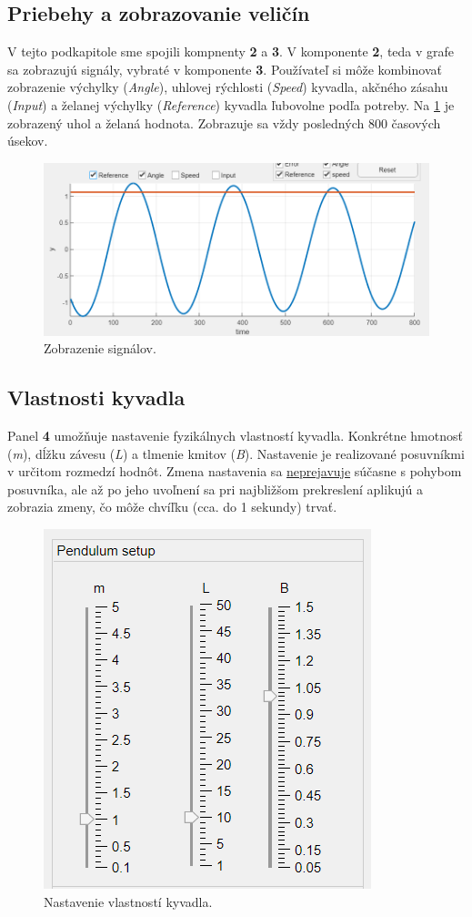  \subsection{Priebehy a zobrazovanie veličín}
 V tejto podkapitole sme spojili kompnenty \textbf{2} a \textbf{3}. V komponente \textbf{2}, teda v grafe sa zobrazujú signály, vybraté v komponente \textbf{3}. 
 Používateľ si môže kombinovať zobrazenie výchylky (\textit{Angle}), uhlovej rýchlosti (\textit{Speed}) kyvadla, akčného zásahu (\textit{Input}) a želanej výchylky (\textit{Reference}) kyvadla ľubovolne podľa potreby. Na \cref{fig:prieb} je zobrazený uhol a želaná hodnota. Zobrazuje sa vždy posledných 800 časových úsekov. 
 	\begin{figure}[h!]
 	\centering
 	\includegraphics[width=0.9\linewidth]{priebehy}
 	\caption{Zobrazenie signálov.}
 	\label{fig:prieb}
 \end{figure}
\newpage
 \subsection{Vlastnosti kyvadla}
 Panel \textbf{4} umožňuje nastavenie fyzikálnych vlastností kyvadla. Konkrétne hmotnosť (\textit{m}), dĺžku závesu (\textit{L}) a tlmenie kmitov (\textit{B}). Nastavenie je realizované posuvníkmi v určitom rozmedzí hodnôt. Zmena nastavenia sa \underline{neprejavuje} súčasne s pohybom posuvníka, ale až po jeho uvoľnení sa pri najbližšom prekreslení aplikujú a zobrazia zmeny, čo môže chvíľku (cca. do 1 sekundy) trvať.
  	\begin{figure}[h!]
 	\centering
 	\includegraphics[width=0.7\linewidth]{fyz}
 	\caption{Nastavenie vlastností kyvadla.}
 	\label{fig:fyz}
 \end{figure}
 
